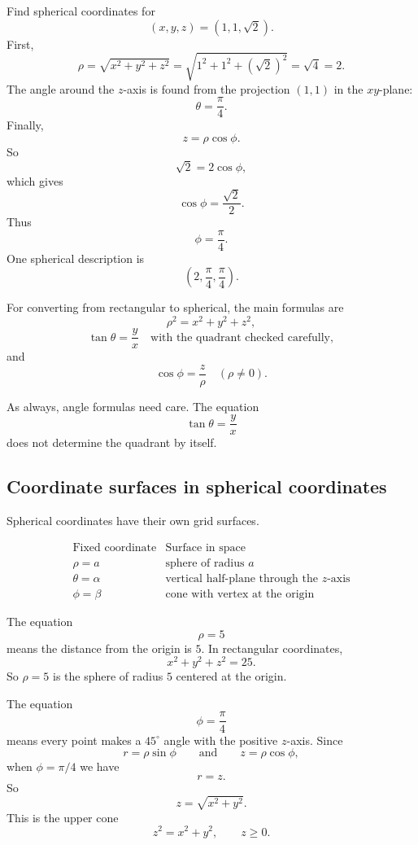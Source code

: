 \begin{example}
Find spherical coordinates for
\[
    (x,y,z)=(1,1,\sqrt2).
\]
First,
\[
    \rho=\sqrt{x^2+y^2+z^2}
    =
    \sqrt{1^2+1^2+(\sqrt2)^2}
    =
    \sqrt4
    =
    2.
\]
The angle around the \(z\)-axis is found from the projection \((1,1)\) in the
\(xy\)-plane:
\[
    \theta=\frac{\pi}{4}.
\]
Finally,
\[
    z=\rho\cos\phi.
\]
So
\[
    \sqrt2=2\cos\phi,
\]
which gives
\[
    \cos\phi=\frac{\sqrt2}{2}.
\]
Thus
\[
    \phi=\frac{\pi}{4}.
\]
One spherical description is
\[
    \left(2,\frac{\pi}{4},\frac{\pi}{4}\right).
\]
\end{example}

For converting from rectangular to spherical, the main formulas are
\[
\boxed{
    \rho^2=x^2+y^2+z^2,
}
\]
\[
\boxed{
    \tan\theta=\frac{y}{x}
    \quad\text{with the quadrant checked carefully},
}
\]
and
\[
\boxed{
    \cos\phi=\frac{z}{\rho}
    \quad(\rho\neq0).
}
\]

As always, angle formulas need care.  The equation
\[
    \tan\theta=\frac{y}{x}
\]
does not determine the quadrant by itself.

\subsection{Coordinate surfaces in spherical coordinates}

Spherical coordinates have their own grid surfaces.

\[
\begin{array}{c|c}
\text{Fixed coordinate} & \text{Surface in space} \\ \hline
\rho=a & \text{sphere of radius }a\\[1mm]
\theta=\alpha & \text{vertical half-plane through the }z\text{-axis}\\[1mm]
\phi=\beta & \text{cone with vertex at the origin}
\end{array}
\]

\begin{example}[A sphere]
The equation
\[
    \rho=5
\]
means the distance from the origin is \(5\).  In rectangular coordinates,
\[
    x^2+y^2+z^2=25.
\]
So \(\rho=5\) is the sphere of radius \(5\) centered at the origin.
\end{example}

\begin{example}[A cone]
The equation
\[
    \phi=\frac{\pi}{4}
\]
means every point makes a \(45^\circ\) angle with the positive \(z\)-axis.  Since
\[
    r=\rho\sin\phi
    \qquad\text{and}\qquad
    z=\rho\cos\phi,
\]
when \(\phi=\pi/4\) we have
\[
    r=z.
\]
So
\[
    z=\sqrt{x^2+y^2}.
\]
This is the upper cone
\[
    z^2=x^2+y^2,
    \qquad z\ge0.
\]
\end{example}


